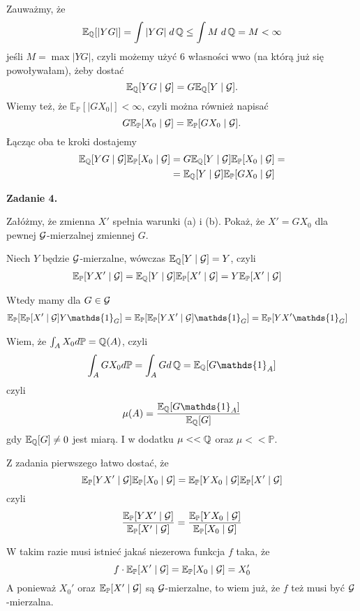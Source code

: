 \documentclass{article}
\newcommand{\E}{\mathbb{E}}
\renewcommand{\P}{\mathbb{P}}
\begin{document}
Zauważmy, że
$$\E_{\Q}[|YG|]=\int|YG|\;d\Q\leq \int M\;d\Q=M<\infty$$
jeśli $M=\max|YG|$, czyli możemy użyć 6 własności wwo (na którą już się powoływałam), żeby dostać
$$\E_{\Q}[YG\;|\;\set{G}]=G\E_{\Q}[Y\;|\;\set{G}].$$
Wiemy też, że $\E_{\P}[|GX_0|]<\infty$, czyli można również napisać
$$G\E_{\P}[X_0\;|\;\set{G}]=\E_{\P}[GX_0\;|\;\set{G}].$$
Łącząc oba te kroki dostajemy
\begin{align*}
  \E_{\Q}[YG\;|\;\set{G}]\E_{\P}[X_0\;|\;\set{G}]&=G\E_{\Q}[Y\;|\;\set{G}]\E_{\P}[X_0\;|\;\set{G}]=\\
      &=\E_{\Q}[Y\;|\;\set{G}]\E_{\P}[GX_0\;|\;\set{G}]
\end{align*}
\bigskip

{\bfseries{\large\color{orange}Zadanie 4.}
  
  Załóżmy, że zmienna $X'$ spełnia warunki (a) i (b). Pokaż, że $X'=GX_0$ dla pewnej $\mathcal{G}$-mierzalnej zmiennej $G$.
}
\medskip

Niech $Y$ będzie $\mathcal{G}$-mierzalne, wówczas $\E_{\Q}[Y\;|\;\set{G}]=Y$, czyli
\begin{align*}
  \E_{\P}[YX'\;|\;\set{G}]&=\E_{\Q}[Y\;|\;\set{G}]\E_{\P}[X'\;|\;\set{G}]=Y\E_{\P}[X'\;|\;\set{G}]
\end{align*}

Wtedy mamy dla $G\in\mathcal{G}$
\begin{align*}
  \E_{\P}[\E_{\P}[X'\;|\;\set{G}]Y\mathds{1}_G]=\E_{\P}[\E_{\P}[YX'\;|\;\set{G}]\mathds{1}_G]&=\E_{\P}[YX'\mathds{1}_G]
\end{align*}

Wiem, że $\int_A X_0 d\P=\Q(A)$, czyli
$$\int_AGX_0d\P=\int_AGd\Q=\E_{\Q}[G\mathds{1}_A]$$
czyli 
$$\mu(A)=\frac{\E_{\Q}[G\mathds{1}_A]}{\E_{\Q}[G]}$$
gdy $\E_{\Q}[G]\neq 0$ jest miarą. I w dodatku $\mu<<\operatorname{\mathbb{Q}}$ oraz $\mu <<\P$.

Z zadania pierwszego łatwo dostać, że
$$\E_{\P}[YX'\;|\;\set{G}]\E_{\P}[X_0\;|\;\set{G}]=\E_{\P}[YX_0\;|\;\set{G}]\E_{\P}[X'\;|\;\set{G}]$$
czyli
$$\frac{\E_{\P}[YX'\;|\;\set{G}]}{\E_{\P}[X'\;|\;\set{G}]}=\frac{\E_{\P}[YX_0\;|\;\set{G}]}{\E_{\P}[X_0\;|\;\set{G}]}$$

W takim razie musi istnieć jakaś niezerowa funkcja $f$ taka, że
$$f\cdot \E_{\P}[X'\;|\;\set{G}]=\E_{\P}[X_0\;|\;\set{G}]=X_0'$$
A ponieważ $X_0'$ oraz $\E_{\P}[X'\;|\;\set{G}]$ są $\mathcal{G}$-mierzalne, to wiem już, że $f$ też musi być $\mathcal{G}$-mierzalna.
\end{document}
